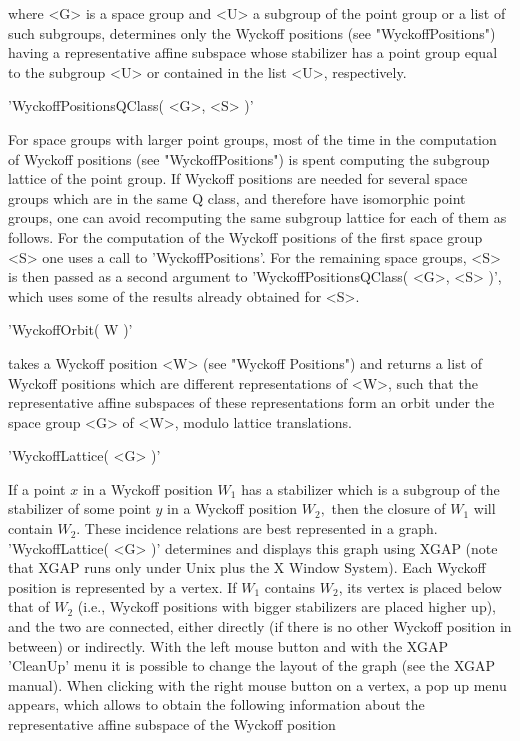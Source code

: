where <G>  is a space group  and <U> a subgroup  of the  point group or a
list  of such subgroups,    determines  only the Wyckoff positions   (see
"WyckoffPositions")  having  a  representative   affine   subspace  whose
stabilizer has a point  group equal to  the subgroup <U> or  contained in
the list <U>, respectively.


'WyckoffPositionsQClass( <G>, <S> )'

For space groups with   larger point groups,  most  of  the time in   the
computation  of  Wyckoff  positions  (see  "WyckoffPositions")  is  spent
computing the subgroup lattice of the point  group.  If Wyckoff positions
are needed for several space  groups which are in  the same Q class,  and
therefore have   isomorphic point groups, one  can  avoid recomputing the
same subgroup lattice  for each of them as  follows.  For the computation
of the Wyckoff positions of the first space group  <S> one uses a call to
'WyckoffPositions'.  For  the remaining space  groups, <S> is then passed
as a second argument to 'WyckoffPositionsQClass( <G>,  <S> )', which uses
some of the results already obtained for <S>.


'WyckoffOrbit( W )'

takes a Wyckoff position <W> (see "Wyckoff Positions") and returns a list
of Wyckoff positions which  are  different representations of  <W>,  such
that the representative affine subspaces of these representations form an
orbit under the space group <G> of <W>, modulo lattice translations.


'WyckoffLattice( <G> )'

If  a point $x$ in a  Wyckoff position $W_1$ has  a stabilizer which is a
subgroup of the stabilizer of some point $y$ in a Wyckoff position $W_2,$
then the  closure of $W_1$ will contain  $W_2$. These incidence relations
are best represented in a  graph.  'WyckoffLattice( <G> )' determines and
displays this graph using XGAP (note that  XGAP runs only under Unix plus
the  X   Window  System). Each    Wyckoff position is   represented  by a
vertex. If $W_1$ contains $W_2$, its vertex is placed below that of $W_2$
(i.e., Wyckoff  positions with bigger stabilizers  are placed higher up),
and the two are connected, either directly  (if there is no other Wyckoff
position  in between) or indirectly. With  the left mouse button and with
the XGAP 'CleanUp' menu it is possible to change the layout  of the graph
(see the XGAP manual).  When clicking with  the right mouse  button  on a
vertex,  a pop up  menu appears,  which  allows to  obtain the  following
information  about the  representative  affine  subspace  of the  Wyckoff
position\:

